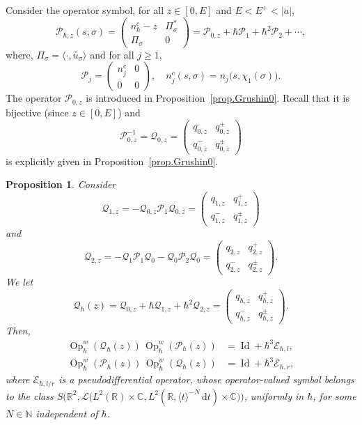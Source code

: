 \documentclass[JEP,XML,SOM,Unicode,NoFloatCountersInSection,published]{cedram}
\newcommand{\rd}{\,\mathrm{d}}
\DeclareMathOperator{\Id}{Id}
\DeclareMathOperator{\Op}{Op}
\theoremstyle{plain}
\newtheorem{proposition}[theorem]{Proposition}
\theoremstyle{definition}
\newcommand{\R}{\mathbb{R}}
\newcommand{\C}{\mathbb{C}}
\begin{document}
Consider the operator symbol, for all $z\in[0,E]$ and $E<E^+<|a|$,
\begin{equation}\label{eq:Gr1}
\mathscr{P}_{\hbar,z}(s,\sigma)=\begin{pmatrix}
n^c_{\hbar}-z&\Pi^*_\sigma\\
\Pi_\sigma&0
\end{pmatrix}=\mathscr{P}_{0,z}+\hbar\mathscr{P}_1+\hbar^2\mathscr{P}_2+\cdots,\end{equation}
where, $\Pi_{\sigma}=\langle \cdot,\overset{\circ}{u}_\sigma \rangle$ and for all $j\geq 1$,
\begin{equation}\label{eq:Gr2}
\mathscr{P}_j=\begin{pmatrix}
n^c_j&0\\
0&0
\end{pmatrix},\quad n_j^c(s,\sigma)=n_j\bigl(s,\chi_1(\sigma)\bigr).
\end{equation}
The operator $\mathscr P_{0,z}$ is introduced in Proposition~\ref{prop.Grushin0}. Recall that it is bijective (since $z\in[0,E]$) and
\begin{equation}\label{eq:Gr3}
\mathscr P_{0,z}^{-1}=\mathscr Q_{0,z}= \left(\begin{array}{cc}
q_{0,z}&q_{0,z}^+\\
q_{0,z}^-&q_{0,z}^\pm
\end{array}\right)
\end{equation}
is explicitly given in Proposition~\ref{prop.Grushin0}.

\begin{proposition}\label{prop.param}
Consider
\[
\mathscr{Q}_{1,z}=-\mathscr{Q}_{0,z}\mathscr{P}_1\mathscr{Q}_{0,z}= \left(\begin{array}{cc}
q_{1,z}&q_{1,z}^+\\
q_{1,z}^-&q_{1,z}^\pm
\end{array}\right)
\]
and
\[
\mathscr{Q}_{2,z}= -\mathscr Q_1\mathscr P_1\mathscr Q_0-\mathscr Q_0\mathscr P_2\mathscr Q_0=\left(\begin{array}{cc}
q_{2,z}&q_{2,z}^+\\
q_{2,z}^-&q_{2,z}^\pm
\end{array}\right).
\]
We let
\[
\mathscr{Q}_{\hbar}(z)=\mathscr{Q}_{0,z}+\hbar\mathscr{Q}_{1,z}+\hbar^2\mathscr{Q}_{2,z}
=\left(\begin{array}{cc}
q_{\hbar,z}&q^+_{\hbar,z}\\
q^-_{\hbar,z}&q^\pm_{\hbar,z}
\end{array}\right).
\]
Then,
\begin{align*}
\Op^w_\hbar (\mathscr{Q}_\hbar(z))\, \Op^w_\hbar (\mathscr{P}_\hbar(z)) &=\Id+\hbar^3\mathscr E_{\hbar,l},\\
\Op^w_\hbar(\mathscr{P}_\hbar(z))\, \Op^w_\hbar(\mathscr{Q}_\hbar(z)) &=\Id+ \hbar^3\mathscr E_{\hbar,r},\end{align*}
where $\mathscr E_{\hbar,l/r}$ is a pseudodifferential operator, whose operator-valued symbol belongs to the class $S\bigl(\R^2,\mathscr{L}\bigl(L^2(\R)\times\C, L^2(\R,\langle t\rangle^{-N}\rd t)\times\C\bigr)\bigr)$, uniformly in $\hbar$, for some $N\in\mathbb{N}$ independent of $\hbar$.
\end{proposition}
\end{document}
